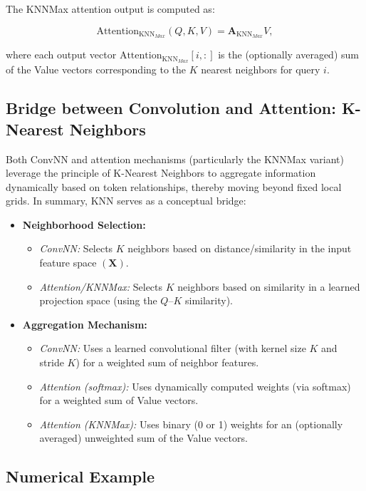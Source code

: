 \documentclass{article}
\begin{document}
The KNNMax attention output is computed as: 

\[
    \text{Attention}_{\text{KNN}_{Max}}(Q, K, V) = \mathbf{A}_{\text{KNN}_{Max}}V,
\]

where each output vector \(\text{Attention}_{\text{KNN}_{Max}}[i, :]\) is the (optionally averaged) sum of the Value vectors corresponding to the \(K\) nearest neighbors for query \(i\).

\subsection{Bridge between Convolution and Attention: K-Nearest Neighbors}

Both ConvNN and attention mechanisms (particularly the KNNMax variant) leverage the principle of K-Nearest Neighbors to aggregate information dynamically based on token relationships, thereby moving beyond fixed local grids. In summary, KNN serves as a conceptual bridge:

\begin{itemize}
    \item \textbf{Neighborhood Selection:}
    \begin{itemize}
    \item \emph{ConvNN:} Selects \( K \) neighbors based on distance/similarity in the input feature space \( (\mathbf{X}) \).
        \item \emph{Attention/KNNMax:} Selects \( K \) neighbors based on similarity in a learned projection space (using the \( Q \)–\( K \) similarity).
    \end{itemize}
    \item \textbf{Aggregation Mechanism:}
    \begin{itemize}
        \item \emph{ConvNN:} Uses a learned convolutional filter (with kernel size \(K\) and stride \(K\)) for a weighted sum of neighbor features.
        \item \emph{Attention (softmax):} Uses dynamically computed weights (via softmax) for a weighted sum of Value vectors.
        \item \emph{Attention (KNNMax):} Uses binary (0 or 1) weights for an (optionally averaged) unweighted sum of the Value vectors.
    \end{itemize}
\end{itemize}


\subsection*{Numerical Example}
\end{document}
